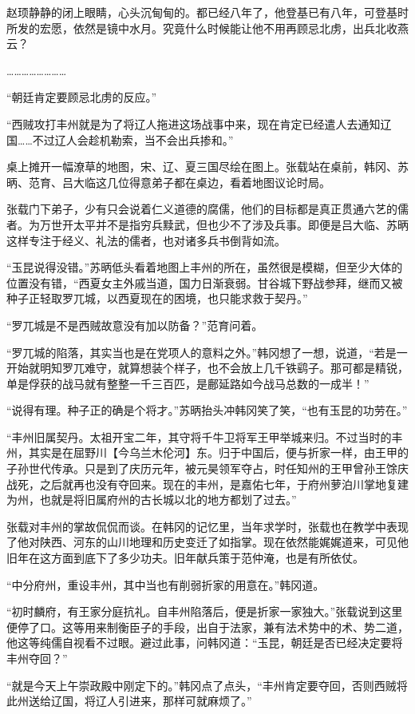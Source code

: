 赵顼静静的闭上眼睛，心头沉甸甸的。都已经八年了，他登基已有八年，可登基时所发的宏愿，依然是镜中水月。究竟什么时候能让他不用再顾忌北虏，出兵北收燕云？

……………………

“朝廷肯定要顾忌北虏的反应。”

“西贼攻打丰州就是为了将辽人拖进这场战事中来，现在肯定已经遣人去通知辽国……不过辽人会趁机勒索，当不会出兵掺和。”

桌上摊开一幅潦草的地图，宋、辽、夏三国尽绘在图上。张载站在桌前，韩冈、苏昞、范育、吕大临这几位得意弟子都在桌边，看着地图议论时局。

张载门下弟子，少有只会说着仁义道德的腐儒，他们的目标都是真正贯通六艺的儒者。为万世开太平并不是指穷兵黩武，但也少不了涉及兵事。即便是吕大临、苏昞这样专注于经义、礼法的儒者，也对诸多兵书倒背如流。

“玉昆说得没错。”苏昞低头看着地图上丰州的所在，虽然很是模糊，但至少大体的位置没有错，“西夏女主外戚当道，国力日渐衰弱。甘谷城下野战参拜，继而又被种子正轻取罗兀城，以西夏现在的困境，也只能求救于契丹。”

“罗兀城是不是西贼故意没有加以防备？”范育问着。

“罗兀城的陷落，其实当也是在党项人的意料之外。”韩冈想了一想，说道，“若是一开始就明知罗兀难守，就算想装个样子，也不会放上几千铁鹞子。那可都是精锐，单是俘获的战马就有整整一千三百匹，是鄜延路如今战马总数的一成半！”

“说得有理。种子正的确是个将才。”苏昞抬头冲韩冈笑了笑，“也有玉昆的功劳在。”

“丰州旧属契丹。太祖开宝二年，其守将千牛卫将军王甲举城来归。不过当时的丰州，其实是在屈野川【今乌兰木伦河】东。归于中国后，便与折家一样，由王甲的子孙世代传承。只是到了庆历元年，被元昊领军夺占，时任知州的王甲曾孙王馀庆战死，之后就再也没有夺回来。现在的丰州，是嘉佑七年，于府州萝泊川掌地复建为州，也就是将旧属府州的古长城以北的地方都划了过去。”

张载对丰州的掌故侃侃而谈。在韩冈的记忆里，当年求学时，张载也在教学中表现了他对陕西、河东的山川地理和历史变迁了如指掌。现在依然能娓娓道来，可见他旧年在这方面到底下了多少功夫。旧年献兵策于范仲淹，也是有所依仗。

“中分府州，重设丰州，其中当也有削弱折家的用意在。”韩冈道。

“初时麟府，有王家分庭抗礼。自丰州陷落后，便是折家一家独大。”张载说到这里便停了口。这等用来制衡臣子的手段，出自于法家，兼有法术势中的术、势二道，他这等纯儒自视看不过眼。避过此事，问韩冈道：“玉昆，朝廷是否已经决定要将丰州夺回？”

“就是今天上午崇政殿中刚定下的。”韩冈点了点头，“丰州肯定要夺回，否则西贼将此州送给辽国，将辽人引进来，那样可就麻烦了。”

